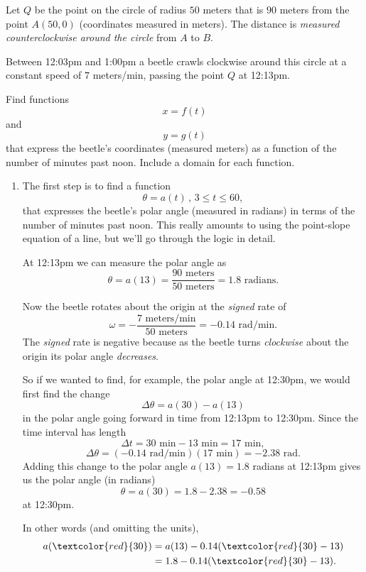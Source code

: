 \documentclass{ximera}
\begin{document}
\begin{question}  \label{Qghggnmnree}
Let $Q$ be the point on the circle of radius $50$ meters that is $90$ meters from the point $A(50,0)$  (coordinates measured in meters). The distance is \emph{measured counterclockwise around the circle} from $A$ to $B$. 

Between 12:03pm and 1:00pm a beetle crawls clockwise around this circle at a constant speed of $7$ meters/min, passing the point $Q$ at 12:13pm.

\item Find functions 
\[
    x = f(t)
\]
and 
\[
 y = g(t)
\]
that express the beetle's coordinates (measured meters) as a function of the number of minutes past noon. Include a domain for 
each function.

\begin{explanation}
\begin{enumerate}
\item The first step is to find a function
\[
     \theta = a(t) \, , \, 3\leq t \leq 60,
\]
that expresses the beetle's polar angle (measured in radians) in terms of the number of minutes past noon. This really amounts to using the point-slope equation of a line, but we'll go through the logic in detail.

At 12:13pm we can measure the polar angle as
\[
  \theta = a(13) = \frac{90\text{ meters}}{50 \text{ meters}} = 1.8 \text{ radians}.
\]

Now the beetle rotates about the origin at the \emph{signed} rate of 
\[
  \omega = - \frac{7 \text{ meters/min}}{50\text{ meters}} = -0.14 \text{ rad/min} .
\]
The \emph{signed} rate is negative because as the beetle turns \emph{clockwise} about the origin its polar angle \emph{decreases}.

So if we wanted to find, for example, the polar angle at 12:30pm, we would first find the change
\[
  \Delta \theta = a(30) - a(13)
\] 
in the polar angle going forward in time from 12:13pm to 12:30pm. Since the time interval has length 
\[
   \Delta t = 30\text{ min} - 13\text{ min} = 17\text{ min} ,
\]
\[
      \Delta \theta = \left( -0.14 \text{ rad/min}  \right)\left( 17 \text{ min} \right) = -2.38\text{ rad} .
\]
Adding this change to the polar angle $a(13) = 1.8$ radians at 12:13pm gives us the polar angle (in radians)
\[
   \theta = a(30) = 1.8 - 2.38 = -0.58
\]
at 12:30pm.

In other words (and omitting the units), 
\begin{align*}
       a(\textcolor{red}{30}) &= a(13) - 0.14(\textcolor{red}{30} - 13)   \\
                &= 1.8  - 0.14(\textcolor{red}{30} - 13) .
\end{align*}


\end{enumerate}
\end{explanation}
\end{question}
\end{document}
